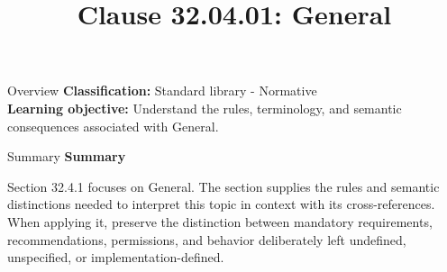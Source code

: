 \documentclass[10pt,letterpaper]{article}
\title{Clause 32.04.01: General}
\author{}
\date{}
\begin{document}
\maketitle
\begin{CornellOverviewBox}{Overview}
\textbf{Classification:} Standard library - Normative\\[2pt]
\textbf{Learning objective:} Understand the rules, terminology, and semantic consequences associated with General.
\end{CornellOverviewBox}\begin{CornellSummaryBox}{Summary}
{\sffamily\bfseries\color{Accent} Summary}\par\vspace{3pt}Section 32.4.1 focuses on General. The section supplies the rules and semantic distinctions needed to interpret this topic in context with its cross-references. When applying it, preserve the distinction between mandatory requirements, recommendations, permissions, and behavior deliberately left undefined, unspecified, or implementation-defined.
\end{CornellSummaryBox}
\end{document}
